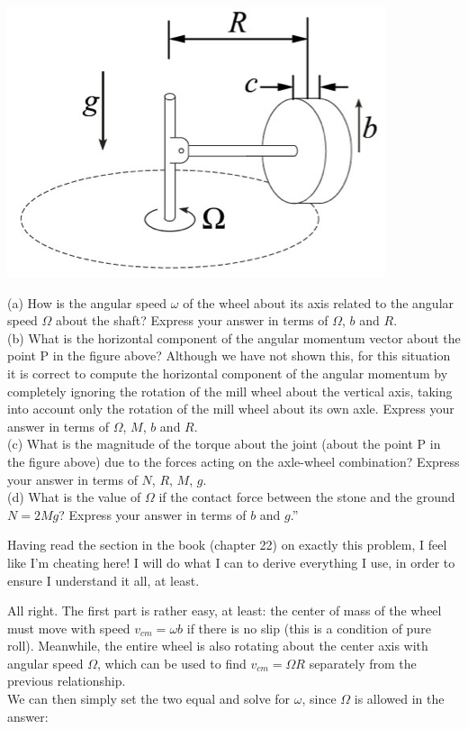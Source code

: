 \documentclass[8.01x]{subfiles}
\begin{document}
\begin{center}
\includegraphics[scale=1.2]{Graphics/h8p9}
\end{center}

(a) How is the angular speed $\omega$ of the wheel about its axis related to the angular speed $\Omega$ about the shaft? Express your answer in terms of $\Omega$, $b$ and $R$.\\
(b) What is the horizontal component of the angular momentum vector about the point P in the figure above? Although we have not shown this, for this situation it is correct to compute the horizontal component of the angular momentum by completely ignoring the rotation of the mill wheel about the vertical axis, taking into account only the rotation of the mill wheel about its own axle. Express your answer in terms of $\Omega$, $M$, $b$ and $R$.\\
(c) What is the magnitude of the torque about the joint (about the point P in the figure above) due to the forces acting on the axle-wheel combination? Express your answer in terms of $N$, $R$, $M$, $g$.\\
(d) What is the value of $\Omega$ if the contact force between the stone and the ground $N = 2 M g$? Express your answer in terms of $b$ and $g$.''

Having read the section in the book (chapter 22) on exactly this problem, I feel like I'm cheating here! I will do what I can to derive everything I use, in order to ensure I understand it all, at least.

All right. The first part is rather easy, at least: the center of mass of the wheel must move with speed $v_{cm} = \omega b$ if there is no slip (this is a condition of pure roll). Meanwhile, the entire wheel is also rotating about the center axis with angular speed $\Omega$, which can be used to find $v_{cm} = \Omega R$ separately from the previous relationship.\\
We can then simply set the two equal and solve for $\omega$, since $\Omega$ is allowed in the answer:
\end{document}
